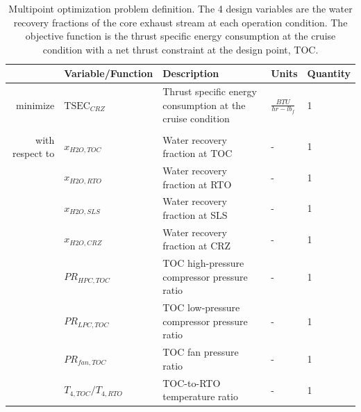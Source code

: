 \documentclass[conf]{new-aiaa}
\begin{document}
\begin{table}[h]
    \centering
    \caption{
        Multipoint optimization problem definition.
        The 4 design variables are the water recovery fractions of the core exhaust stream at each operation condition.
        The objective function is the thrust specific energy consumption at the cruise condition with a net thrust constraint at the design point, TOC.
    }
    \small
    \renewcommand{\arraystretch}{1.2}
    \begin{tabular}{r l l l l}
        \toprule
                        & Variable/Function           & Description                                                & Units                 & Quantity \\
        \hline
        minimize        & $ \text{TSEC}_{CRZ} $       & Thrust specific energy consumption at the cruise condition & $\frac{BTU}{hr-lb_f}$ & 1        \\
                        &                             &                                                            &                       &          \\
        with respect to & $x_{H2O,TOC}$               & Water recovery fraction at TOC                             & -                     & 1        \\
                        & $x_{H2O,RTO}$               & Water recovery fraction at RTO                             & -                     & 1        \\
                        & $x_{H2O,SLS}$               & Water recovery fraction at SLS                             & -                     & 1        \\
                        & $x_{H2O,CRZ}$               & Water recovery fraction at CRZ                             & -                     & 1        \\
                        & $PR_{HPC,TOC}$              & TOC high-pressure compressor pressure ratio                & -                     & 1        \\
                        & $PR_{LPC,TOC}$              & TOC low-pressure compressor pressure ratio                 & -                     & 1        \\
                        & $PR_{fan,TOC}$              & TOC fan pressure ratio                                     & -                     & 1        \\
                        & $T_{4,TOC}/T_{4,RTO}$       & TOC-to-RTO temperature ratio                               & -                     & 1        \\

\end{tabular}
\end{table}
\end{document}
